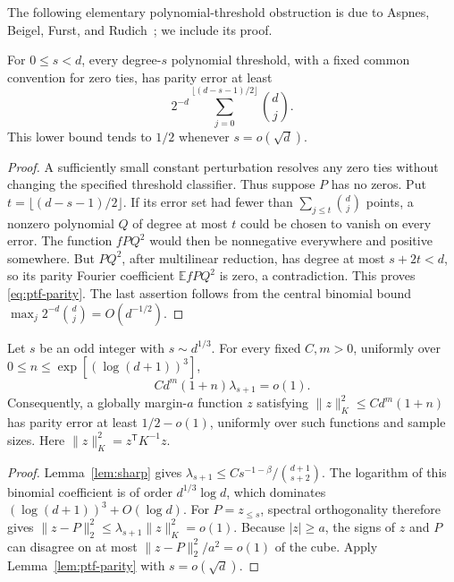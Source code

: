 The following elementary polynomial-threshold obstruction is due to
Aspnes, Beigel, Furst, and Rudich~\cite{ABFR}; we include its proof.
\begin{lemma}
\label{lem:ptf-parity}
For $0\le s<d$, every degree-$s$ polynomial threshold, with a fixed common convention
for zero ties, has parity error at least
\begin{equation}\label{eq:ptf-parity}
 2^{-d}\sum_{j=0}^{\lfloor(d-s-1)/2\rfloor}\binom dj.
\end{equation}
This lower bound tends to $1/2$ whenever $s=o(\sqrt d)$.
\end{lemma}
\begin{proof}
A sufficiently small constant perturbation resolves any zero ties
without changing the specified threshold classifier. Thus suppose
$P$ has no zeros. Put $t=\lfloor(d-s-1)/2\rfloor$. If its error set
had fewer than $\sum_{j\le t}\binom dj$ points, a nonzero polynomial
$Q$ of degree at most $t$ could be chosen to vanish on every error.
The function $fPQ^2$ would then be nonnegative everywhere and positive
somewhere. But $PQ^2$, after multilinear reduction, has degree at most
$s+2t<d$, so its parity Fourier coefficient
$\mathbb E fPQ^2$ is zero, a contradiction. This proves
\eqref{eq:ptf-parity}. The last assertion follows from the central
binomial bound $\max_j2^{-d}\binom dj=O(d^{-1/2})$.
\end{proof}

\begin{lemma}\label{lem:small-cutoff}
Let $s$ be an odd integer with $s\sim d^{1/3}$. For every fixed
$C,m>0$, uniformly over $0\le n\le\exp[(\log(d+1))^3]$,
\[
 C d^m(1+n)\lambda_{s+1}=o(1).
\]
Consequently, a globally margin-$a$ function $z$ satisfying
$\|z\|_K^2\le C d^m(1+n)$ has parity error at least $1/2-o(1)$,
uniformly over such functions and sample sizes. Here
$\|z\|_K^2=z^{\mathsf T}K^{-1}z$.
\end{lemma}
\begin{proof}
Lemma~\ref{lem:sharp} gives
$\lambda_{s+1}\le C s^{-1-\beta}/\binom{d+1}{s+2}$.
The logarithm of this binomial coefficient is of order
$d^{1/3}\log d$, which dominates $(\log(d+1))^3+O(\log d)$.
For $P=z_{\le s}$, spectral orthogonality therefore gives
$\|z-P\|_2^2\le\lambda_{s+1}\|z\|_K^2=o(1)$.
Because $|z|\ge a$, the signs of $z$ and $P$ can disagree on at
most $\|z-P\|_2^2/a^2=o(1)$ of the cube. Apply
Lemma~\ref{lem:ptf-parity} with $s=o(\sqrt d)$.
\end{proof}

